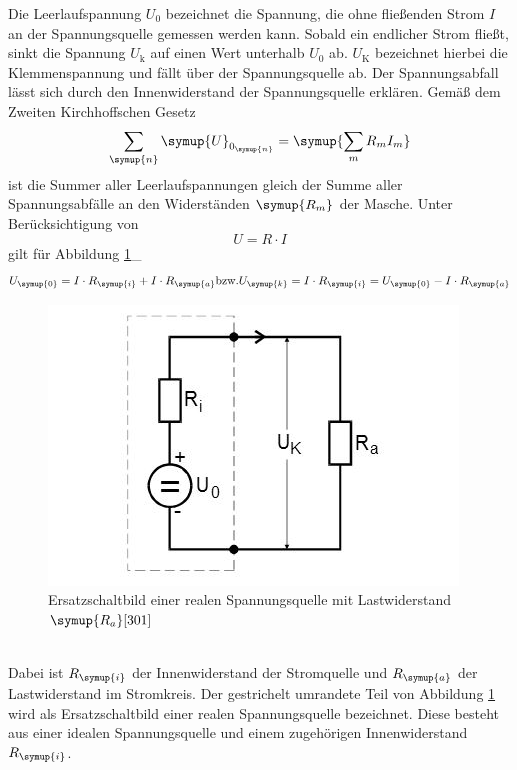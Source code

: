Die Leerlaufspannung $U_{\text{0}}$ bezeichnet die Spannung, die ohne
fließenden Strom $I$ an der Spannungsquelle gemessen werden kann.
Sobald ein endlicher Strom fließt, sinkt die Spannung $U_{\text{k}}$ auf einen
Wert unterhalb $U_{\text{0}}$ ab. $U_{\text{K}}$ bezeichnet hierbei die
Klemmenspannung und fällt über der Spannungsquelle ab.
Der Spannungsabfall lässt sich durch den Innenwiderstand der Spannungsquelle
erklären.
Gemäß dem Zweiten Kirchhoffschen Gesetz
\begin{equation}
  \sum_\symup{n} \symup{U}_{0_\symup{n}} = \symup{\sum_m R_m I_m}
  \label{eqn:kirch}
\end{equation}
ist die Summer aller Leerlaufspannungen gleich der Summe aller
Spannungsabfälle an den Widerständen $\symup{R_m}$ der Masche.
Unter Berücksichtigung von
\begin{equation}
  U=R\cdot I
\end{equation}
gilt für Abbildung \ref{fig:real}_
\begin{equation}
  U_\symup{0}=I \cdot R_\symup{i} + I \cdot R_\symup{a}
  \text{bzw.}
  U_\symup{k}=I \cdot R_\symup{i} = U_\symup{0} - I \cdot R_\symup{a}
  \label{eqn:U0k}
\end{equation}
\begin{figure}[H]
  \includegraphics{bilder/real}
  \caption{Ersatzschaltbild einer realen Spannungsquelle mit Lastwiderstand
  $\symup{R_a}\cite{301}$}
  \label{fig:real}
\end{figure}
\\
Dabei ist $R_\symup{i}$ der Innenwiderstand der Stromquelle und $R_\symup{a}$
der Lastwiderstand im Stromkreis.
Der gestrichelt umrandete Teil von Abbildung \ref{fig:real} wird als
Ersatzschaltbild einer realen Spannungsquelle bezeichnet. Diese besteht aus
einer idealen Spannungsquelle und einem zugehörigen Innenwiderstand
$R_\symup{i}$.
